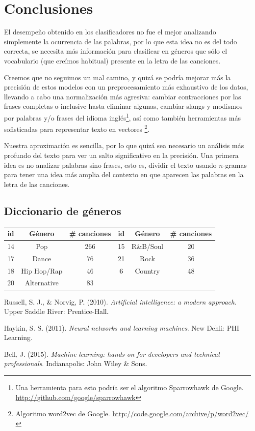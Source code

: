 \documentclass[spanish,11pt,letterpaper]{article}
\begin{document}
\section{Conclusiones}

El desempeño obtenido en los clasificadores no fue el mejor analizando simplemente
la ocurrencia de las palabras, por lo que esta idea no es del todo correcta, se
necesita más información para clasificar en géneros que sólo el vocabulario (que
creímos habitual) presente en la letra de las canciones.

Creemos que no seguimos un mal camino, y quizá se podría mejorar más la precisión
de estos modelos con un preprocesamiento más exhaustivo de los datos, llevando a
cabo una normalización más agresiva: cambiar contracciones por las frases
completas o inclusive hasta eliminar algunas, cambiar slangs y modismos por
palabras y/o frases del idioma inglés\footnote{Una herramienta para esto podría
ser el algoritmo Sparrowhawk de Google. \url{http://github.com/google/sparrowhawk}},
así como también herramientas más sofisticadas para representar texto en vectores%
\footnote{Algoritmo word2vec de Google. \url{http://code.google.com/archive/p/word2vec/}}.

Nuestra aproximación es sencilla, por lo que quizá sea necesario un análisis más
profundo del texto para ver un salto significativo en la precisión. Una primera idea
es no analizar palabras sino frases, esto es, dividir el texto usando
$n$-gramas para tener una idea más amplia del contexto en que aparecen las palabras
en la letra de las canciones.

\begin{appendices}
\section{Diccionario de géneros}
\begin{center}
\begin{tabular}{|c|c|c||c|c|c|}
\hline
id & Género & \# canciones & id & Género & \# canciones\\
\hline
14 & Pop & 266 & 15 & R\&B/Soul & 20 \\
17 & Dance & 76 & 21 & Rock & 36 \\
18 & Hip Hop/Rap & 46 & 6 & Country & 48 \\
20 & Alternative & 83 & & & \\
\hline
\end{tabular}
\end{center}
\end{appendices}

\begin{thebibliography}{9}
Russell, S. J., \& Norvig, P. (2010).
\textit{Artificial intelligence: a modern approach}.
Upper Saddle River: Prentice-Hall.

Haykin, S. S. (2011).
\textit{Neural networks and learning machines}.
New Dehli: PHI Learning.

Bell, J. (2015).
\textit{Machine learning: hands-on for developers and technical professionals}.
Indianapolis: John Wiley \& Sons.
\end{thebibliography}
\end{document}

